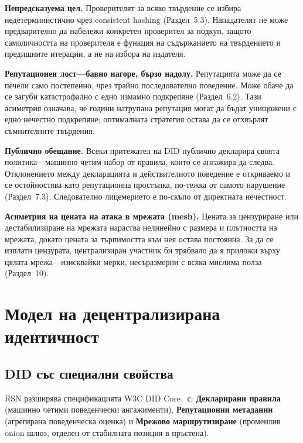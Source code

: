 \documentclass[11pt,a4paper,twocolumn]{article}
\begin{document}
\textbf{Непредсказуема цел.} Проверителят за всяко твърдение се избира недетерминистично чрез consistent hashing (Раздел~5.3). Нападателят не може предварително да набележи конкретен проверител за подкуп, защото самоличността на проверителя е функция на съдържанието на твърдението и предишните итерации, а не на избора на издателя.

\textbf{Репутационен лост---бавно нагоре, бързо надолу.} Репутацията може да се печели само постепенно, чрез трайно последователно поведение. Може обаче да се загуби катастрофално с едно измамно подкрепяне (Раздел~6.2). Тази асиметрия означава, че години натрупана репутация могат да бъдат унищожени с едно нечестно подкрепяне; оптималната стратегия остава да се отхвърлят съмнителните твърдения.

\textbf{Публично обещание.} Всеки притежател на DID публично декларира своята политика---машинно четим набор от правила, които се ангажира да следва. Отклонението между декларацията и действителното поведение е откриваемо и се остойностява като репутационна простъпка, по-тежка от самото нарушение (Раздел~7.3). Следователно лицемерието е по-скъпо от директната нечестност.

\textbf{Асиметрия на цената на атака в мрежата (mesh).} Цената за цензуриране или дестабилизиране на мрежата нараства нелинейно с размера и плътността на мрежата, докато цената за търпимостта към нея остава постоянна. За да се изплати цензурата, централизиран участник би трябвало да я приложи върху цялата мрежа---изисквайки мерки, несъразмерни с всяка мислима полза (Раздел~10).

\section{Модел на децентрализирана идентичност}

\subsection{DID със специални свойства}

RSN разширява спецификацията W3C DID Core~\cite{did2022} с: \textbf{Декларирани правила} (машинно четими поведенчески ангажименти), \textbf{Репутационни метаданни} (агрегирана поведенческа оценка) и \textbf{Мрежово маршрутизиране} (променлив onion шлюз, отделен от стабилната позиция в пръстена).
\end{document}
